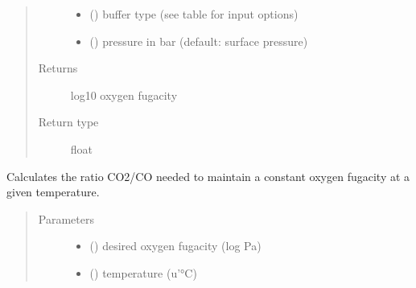 \documentclass[letterpaper,10pt,english]{sphinxmanual}
\begin{document}
\begin{fulllineitems}
\begin{fulllineitems}
\begin{quote}
\begin{description}
\begin{itemize}
\item {} 
 () \textendash{} buffer type (see table for input options)

\item {} 
 (\sphinxstyleliteralemphasis{\sphinxupquote{, }}) \textendash{} pressure in bar (default: surface pressure)

\end{itemize}

\item[{Returns}] \leavevmode
log10 oxygen fugacity

\item[{Return type}] \leavevmode
float

\end{description}\end{quote}

\end{fulllineitems}


\begin{fulllineitems}
\label{\detokenize{source/laboratory.drivers:laboratory.drivers.mfc.MFC.fugacity_co}}
Calculates the ratio CO2/CO needed to maintain a constant oxygen fugacity at a given temperature.
\begin{quote}\begin{description}
\item[{Parameters}] \leavevmode\begin{itemize}
\item {} 
 (\sphinxstyleliteralemphasis{\sphinxupquote{, }}) \textendash{} desired oxygen fugacity (log Pa)

\item {} 
 (\sphinxstyleliteralemphasis{\sphinxupquote{, }}) \textendash{} temperature (u’°C)


\end{itemize}
\end{description}
\end{quote}
\end{fulllineitems}
\end{fulllineitems}
\end{document}
